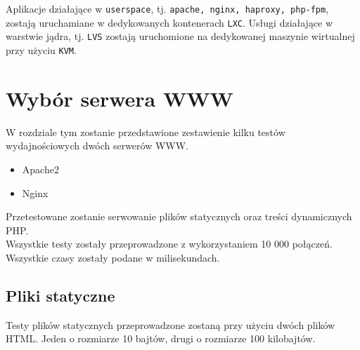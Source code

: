 Aplikacje działające w \texttt{userspace}, tj. \texttt{apache, nginx, haproxy, php-fpm}, zostają uruchamiane w dedykowanych kontenerach \texttt{LXC}.
Usługi działające w warstwie jądra, tj. \texttt{LVS} zostają uruchomione na dedykowanej maszynie wirtualnej przy użyciu \texttt{KVM}.
\section{Wybór serwera WWW}
\label{sec:wybor}
W rozdziale tym zostanie przedstawione zestawienie kilku testów wydajnościowych dwóch serwerów WWW\@.
\begin{itemize}
\item Apache2
\item Nginx
\end{itemize}
Przetestowane zostanie serwowanie plików statycznych oraz treści dynamicznych PHP{.}\\
Wszystkie testy zostały przeprowadzone z wykorzystaniem 10 000 połączeń.
Wszystkie czasy zostały podane w milisekundach.
\subsection{Pliki statyczne}
Testy plików statycznych przeprowadzone zostaną przy użyciu dwóch plików HTML{.}
Jeden o rozmiarze 10 bajtów, drugi o rozmiarze 100 kilobajtów.

